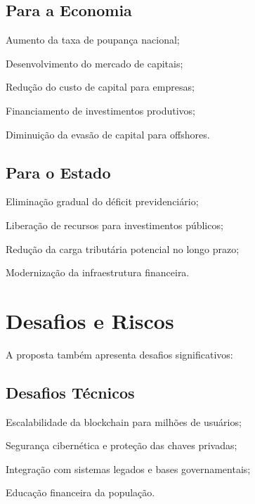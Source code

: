 \subsection{Para a Economia}

\begin{alineas}
    \item Aumento da taxa de poupança nacional;
    \item Desenvolvimento do mercado de capitais;
    \item Redução do custo de capital para empresas;
    \item Financiamento de investimentos produtivos;
    \item Diminuição da evasão de capital para offshores.
\end{alineas}

\subsection{Para o Estado}

\begin{alineas}
    \item Eliminação gradual do déficit previdenciário;
    \item Liberação de recursos para investimentos públicos;
    \item Redução da carga tributária potencial no longo prazo;
    \item Modernização da infraestrutura financeira.
\end{alineas}

\section{Desafios e Riscos}

A proposta também apresenta desafios significativos:

\subsection{Desafios Técnicos}

\begin{alineas}
    \item Escalabilidade da blockchain para milhões de usuários;
    \item Segurança cibernética e proteção das chaves privadas;
    \item Integração com sistemas legados e bases governamentais;
    \item Educação financeira da população.
\end{alineas}

